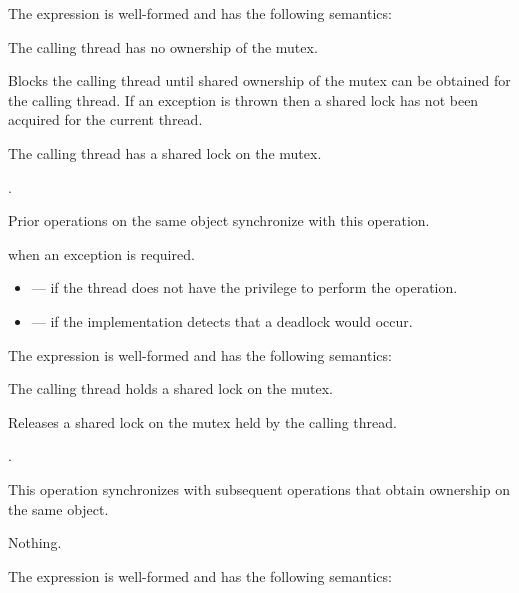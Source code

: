 \pnum
The expression  is well-formed and has the
following semantics:

\begin{itemdescr}
\pnum
\expects
The calling thread has no ownership of the mutex.

\pnum
{}%
\effects
Blocks the calling thread until shared ownership of the mutex can be obtained for the calling thread.
If an exception is thrown then a shared lock has not been acquired for the current thread.

\pnum
\ensures
The calling thread has a shared lock on the mutex.

\pnum
\returntype {}.

\pnum
\sync
Prior  operations on the same object synchronize with this operation.

\pnum
\throws
{} when an exception is required.

\pnum
\errors
\begin{itemize}
\item {} --- if the thread does not have the privilege to perform the operation.
\item {} --- if the implementation detects that a deadlock would occur.
\end{itemize}
\end{itemdescr}

\pnum
The expression  is well-formed and has the following semantics:

\begin{itemdescr}
\pnum
\expects
The calling thread holds a shared lock on the mutex.

\pnum
\effects
Releases a shared lock on the mutex held by the calling thread.

\pnum
\returntype {}.

\pnum
\sync
This operation synchronizes with subsequent
 operations that obtain ownership on the same object.

\pnum
\throws
Nothing.
\end{itemdescr}

\pnum
The expression  is well-formed and has the following semantics:

